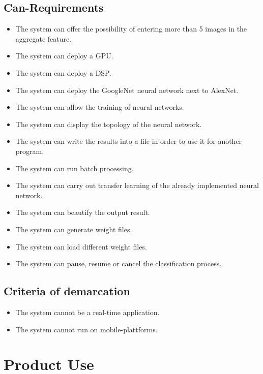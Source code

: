 \documentclass[parskip=full]{scrartcl}
\begin{document}
\subsection{Can-Requirements}

\begin{itemize}
	\item The system can offer the possibility of entering more than 5 images in the aggregate feature.
	\item The system can deploy a GPU.
	\item The system can deploy a DSP.
	\item The system can deploy the GoogleNet neural network next to AlexNet. 
	\item The system can allow the training of neural networks.
	\item The system can display the topology of the neural network.
	\item The system can write the results into a file in order to use it for another program.
	\item The system can run batch processing.
	\item The system can carry out transfer learning of the already implemented neural network.
	\item The system can beautify the output result.
	\item The system can generate weight files.
	\item The system can load different weight files.
	\item The system can pause, resume or cancel the classification process.
\end{itemize}

\subsection{Criteria of demarcation}

\begin{itemize}
	\item The system cannot be a real-time application.
	\item The system cannot run on mobile-plattforms.
\end{itemize}

\pagebreak






\section{Product Use}
\end{document}
